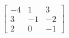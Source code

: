 \[
  \left[
  \begin{array}{ccc}
  	-4 & 1 & 3 \\
	  3 & -1 & -2 \\
	  2 & 0 & -1
  \end{array}
  \right]
  \]